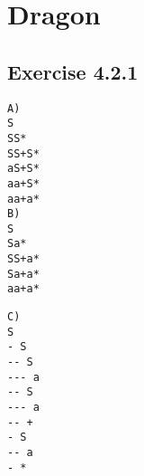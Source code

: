 \documentclass[letterpaper, 10pt]{article}
\begin{document}
\section{Dragon}
\subsection{Exercise 4.2.1}
\begin{verbatim}
A)
S
SS*
SS+S*
aS+S*
aa+S*
aa+a*
B)
S
Sa*
SS+a*
Sa+a*
aa+a*
\end{verbatim}
\newpage
\begin{verbatim}
C)
S
- S
-- S
--- a
-- S
--- a
-- +
- S
-- a
- *
\end{verbatim}
\end{document}
